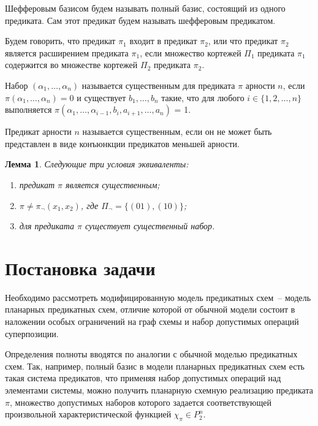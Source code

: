 \documentclass[12pt]{extarticle}
\newtheorem{lemma}[theorem]{Лемма}
\newenvironment{definition}[1][Определение.]{\begin{trivlist}
\item[\hskip \labelsep {\bfseries #1}]}{\end{trivlist}}
\begin{document}
\begin{definition}
Шефферовым базисом будем называть полный базис, состоящий из одного предиката. Сам этот предикат
будем называть шефферовым предикатом.
\end{definition}


\begin{definition}
Будем говорить, что предикат $\pi_1$ входит в предикат $\pi_2$, или что предикат $\pi_2$ является
расширением предиката $\pi_1$, если множество кортежей $\Pi_1$ предиката $\pi_1$ 
содержится во множестве кортежей $\Pi_2$ предиката $\pi_2$.
\end{definition}

\begin{definition}
Набор $(\alpha_1, \dots, \alpha_n)$ называется существенным для предиката $\pi$ арности $n$, если
$\pi(\alpha_1, \dots, \alpha_n) = 0$ и существует $b_1, \dots, b_n$ такие, что для любого $i \in \{ 1, 2, \dots, n\}$
выполняется 
$\pi(\alpha_1, \dots, \alpha_{i-1}, b_i, a_{i+1}, \dots, a_n)$ = 1.
\end{definition}

\begin{definition}
Предикат арности $n$ называется существенным, если он не может быть представлен в виде конъюнкции
предикатов меньшей арности.
\end{definition}

\begin{lemma}
\label{susch_lemma}
Следующие три условия эквиваленты: 
\begin{enumerate}
\item предикат $\pi$ является существенным;
\item $\pi \neq \pi_{\neg}(x_1, x_2)$, где $\Pi_{\neg} = \{ (01), (10) \}$;
\item для предиката $\pi$ существует существенный набор. \cite{Zhuk}
\end{enumerate}
\end{lemma}

\clearpage

\section{Постановка задачи}
Необходимо рассмотреть модифицированную модель предикатных схем~-- модель планарных предикатных схем, 
отличие которой от обычной модели состоит в наложении особых ограничений на граф схемы и набор допустимых операций 
суперпозиции. 

Определения полноты вводятся по аналогии с обычной моделью предикатных схем. Так, например, полный базис
в модели планарных предикатных схем есть такая система предикатов, что 
применяя набор допустимых
операций над элементами системы, можно получить планарную схемную реализацию предиката $\pi$, множество
допустимых наборов которого задается соответствующей произвольной характеристической функцией $\chi_{\pi} \in P_2^n$. 
\end{document}
